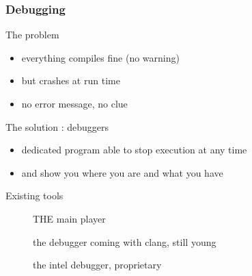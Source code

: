 \begin{frame}[fragile]
  \frametitle{Debugging}
  \begin{alertblock}{The problem}
    \begin{itemize}
      \item everything compiles fine (no warning)
      \item but crashes at run time
      \item no error message, no clue
    \end{itemize}
  \end{alertblock}
  \pause
  \begin{block}{The solution : debuggers}
    \begin{itemize}
    \item dedicated program able to stop execution at any time
    \item and show you where you are and what you have
    \end{itemize}
  \end{block}
  \pause
  \begin{block}{Existing tools}
    \begin{description}
    \item[\href{http://www.sourceware.org/gdb/}{}]
      THE main player
    \item[\href{http://lldb.llvm.org/}{}]
      the debugger coming with clang, still young
    \item[\href{http://software.intel.com/en-us/articles/idb-linux}{}]
      the intel debugger, proprietary
    \end{description}
  \end{block}
\end{frame}

